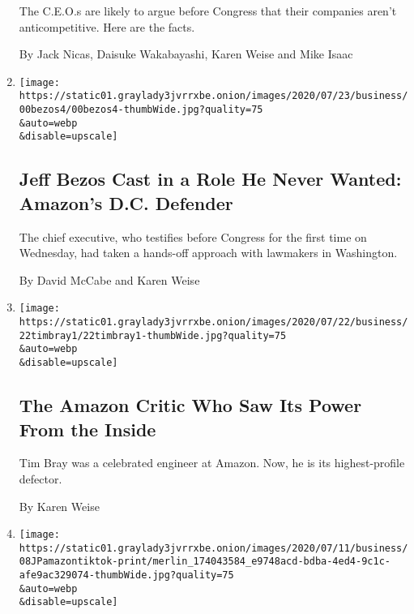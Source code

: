 \begin{enumerate}
  The C.E.O.s are likely to argue before Congress that their companies
  aren't anticompetitive. Here are the facts.

  By Jack Nicas, Daisuke Wakabayashi, Karen Weise and Mike Isaac
\item
  \href{/2020/07/27/business/jeff-bezos-amazon-congress.html}{}

  \texttt{[image: https://static01.graylady3jvrrxbe.onion/images/2020/07/23/business/00bezos4/00bezos4-thumbWide.jpg?quality=75\\\&auto=webp\\\&disable=upscale]}

  \hypertarget{jeff-bezos-cast-in-a-role-he-never-wanted-amazons-dc-defender}{%
  \subsection{Jeff Bezos Cast in a Role He Never Wanted: Amazon's D.C.
  Defender}\label{jeff-bezos-cast-in-a-role-he-never-wanted-amazons-dc-defender}}

  The chief executive, who testifies before Congress for the first time
  on Wednesday, had taken a hands-off approach with lawmakers in
  Washington.

  By David McCabe and Karen Weise
\item
  \href{/2020/07/22/technology/amazon-critic-tim-bray.html}{}

  \texttt{[image: https://static01.graylady3jvrrxbe.onion/images/2020/07/22/business/22timbray1/22timbray1-thumbWide.jpg?quality=75\\\&auto=webp\\\&disable=upscale]}

  \hypertarget{the-amazon-critic-who-saw-its-power-from-the-inside}{%
  \subsection{The Amazon Critic Who Saw Its Power From the
  Inside}\label{the-amazon-critic-who-saw-its-power-from-the-inside}}

  Tim Bray was a celebrated engineer at Amazon. Now, he is its
  highest-profile defector.

  By Karen Weise
\item
  \href{/2020/07/10/technology/tiktok-amazon-security-risk.html}{}

  \texttt{[image: https://static01.graylady3jvrrxbe.onion/images/2020/07/11/business/08JPamazontiktok-print/merlin\_174043584\_e9748acd-bdba-4ed4-9c1c-afe9ac329074-thumbWide.jpg?quality=75\\\&auto=webp\\\&disable=upscale]}

  \hypertarget{amazon-backtracks-from-demand-that-employees-delete-tiktok}{%
}
\end{enumerate}
